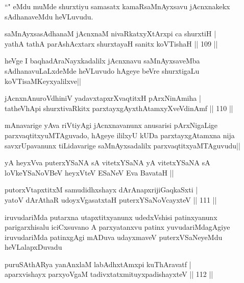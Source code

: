 \begin{artha}
``\stext " eMdu muMde shurxtiyu samasatx kamaRsaMnAyxsavu jAcnxnakekx sAdhanaveMdu heVLuvudu. 
\end{artha}

\begin{shl}
saMnAyxsasAdhanaM jAcnxnaM nivaRkatxyXtArxpi ca shurxtiH |\\
yathA tathA parAshAcxtarx shurxtayaH sanitx koVTishaH \hfill || 109 ||
\end{shl}

\begin{artha}%
heVge I baqhadAraNayxkadalilx jAcnxnavu saMnAyxsaveMba sAdhanavuLaLxdeMde heVLuvudo hAgeye beVre shurxtigaLu koVTisaMKeyxyalilxve||
\end{artha}

\begin{shl}
jAcnxnAnuroVdhiniV yadavxtapxrXvaqtitxH pArxNinAmiha |\\
tatheVhApi shurxtivaRkitx parxtayxgAyxthAtamxyXveVdinAmf \hfill || 110 ||
\end{shl}

\begin{artha}
mAnavarige yAva riVtiyAgi jAcnxnavanunx anusarisi pArxNigaLige parxvaqtitxyuMTAguvado, hAgeye ililxyU kUDa parxtayxgAtamxna nija savxrUpavanunx tiLidavarige saMnAyxsadalilx parxvaqtitxyaMTAguvudu||
\end{artha}

\begin{shl}
yA heyxVva puterxYSaNA sA vitetxYSaNA yA vitetxYSaNA sA loVkeYSaNoVBeV heyxVteV ESaNeV Eva BavataH ||
\end{shl}


\begin{shl}
putorxVtapxtitxM samudidhxshayx dArAnapxrijiGaqkaSxti |\\
yatoV dArAthaR udoyxVgasatxtaH puterxYSaNoVcayxteV \hfill || 111 ||
\end{shl}

\begin{artha}
iruvudariMda putarxna utapxtitxyanunx udedxVshisi patinxyanunx parigarxhisalu iciCxsuvano A parxyatanxvu patinx yuvudariMdagAgiye  iruvudariMda patinxgAgi mADuva udayxmaveV puterxVSaNeyeMdu heVLalapxDuvadu 
\end{artha}

\begin{shl}
puruSAthARya yanAnxlaM labAdhxtAmx\s pi kuThAravatf |\\
aparxvishayx parxyoVgaM tadivxtatxmituyxpadishayxteV \hfill || 112 ||
\end{shl}

